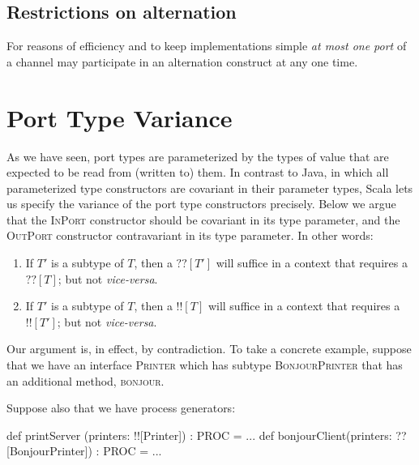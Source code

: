 \documentclass[12pt]{IOS-Book-Article-CPA-2017}
\begin{document}
\subsection{Restrictions on alternation}
For reasons of efficiency and to keep implementations simple \textit{at most
one port} of a channel may participate in an alternation 
construct at any one time.


\section{Port Type Variance}
As we have seen, port types are parameterized by the types of
value that are expected to be read from (written to) them.
In contrast to Java, in which all parameterized type constructors are 
covariant in their parameter types, Scala lets us specify the variance 
of the port type constructors precisely. 
%
Below we argue that the \textsc{InPort} constructor should be covariant in its type
parameter, and the \textsc{OutPort} constructor contravariant in its type 
parameter. In other words:

\begin{enumerate}
\item If $T'$ is a subtype of $T$, then a $??[T']$ will
suffice in a context that requires a  $??[T]$; but not \textit{vice-versa}.

\item If $T'$ is a subtype of $T$, then a $!![T]$ will
suffice in a context that requires a  $!![T']$; but not \textit{vice-versa}.
   
\end{enumerate}

Our argument is, in effect,  by contradiction. To take a concrete example, suppose that
we have an interface \textsc{Printer} which has subtype
\textsc{BonjourPrinter} that has an additional method, \textsc{bonjour}.

Suppose also that we have process generators: 
\begin{code}
        def printServer  (printers: !![Printer]) : PROC = ...
        def bonjourClient(printers: ??[BonjourPrinter]) : PROC = ...
\end{code}
\end{document}
